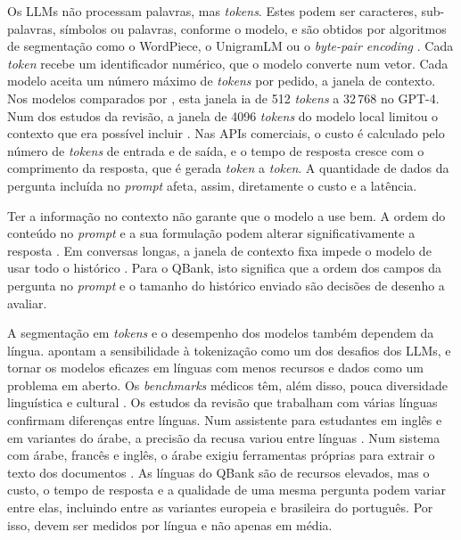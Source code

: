 Os \glspl{LLM} não processam palavras, mas \emph{tokens}. Estes podem ser caracteres, sub-palavras, símbolos ou palavras, conforme o modelo, e são obtidos por algoritmos de segmentação como o WordPiece, o UnigramLM ou o \emph{byte-pair encoding} \parencite{raiaan2024review}. Cada \emph{token} recebe um identificador numérico, que o modelo converte num vetor. Cada modelo aceita um número máximo de \emph{tokens} por pedido, a janela de contexto. Nos modelos comparados por \textcite{raiaan2024review}, esta janela ia de 512 \emph{tokens} a 32\,768 no GPT-4. Num dos estudos da revisão, a janela de 4096 \emph{tokens} do modelo local limitou o contexto que era possível incluir \parencite{azam2024cancerbot}. Nas \glspl{API} comerciais, o custo é calculado pelo número de \emph{tokens} de entrada e de saída, e o tempo de resposta cresce com o comprimento da resposta, que é gerada \emph{token} a \emph{token}. A quantidade de dados da pergunta incluída no \emph{prompt} afeta, assim, diretamente o custo e a latência.

Ter a informação no contexto não garante que o modelo a use bem. A ordem do conteúdo no \emph{prompt} e a sua formulação podem alterar significativamente a resposta \parencite{hu2025advancing}. Em conversas longas, a janela de contexto fixa impede o modelo de usar todo o histórico \parencite{hu2025advancing}. Para o QBank, isto significa que a ordem dos campos da pergunta no \emph{prompt} e o tamanho do histórico enviado são decisões de desenho a avaliar.

A segmentação em \emph{tokens} e o desempenho dos modelos também dependem da língua. \textcite{raiaan2024review} apontam a sensibilidade à tokenização como um dos desafios dos \glspl{LLM}, e tornar os modelos eficazes em línguas com menos recursos e dados como um problema em aberto. Os \emph{benchmarks} médicos têm, além disso, pouca diversidade linguística e cultural \parencite{hu2025advancing}. Os estudos da revisão que trabalham com várias línguas confirmam diferenças entre línguas. Num assistente para estudantes em inglês e em variantes do árabe, a precisão da recusa variou entre línguas \parencite{abrar2025domain}. Num sistema com árabe, francês e inglês, o árabe exigiu ferramentas próprias para extrair o texto dos documentos \parencite{sbai2025advanced}. As línguas do QBank são de recursos elevados, mas o custo, o tempo de resposta e a qualidade de uma mesma pergunta podem variar entre elas, incluindo entre as variantes europeia e brasileira do português. Por isso, devem ser medidos por língua e não apenas em média.

